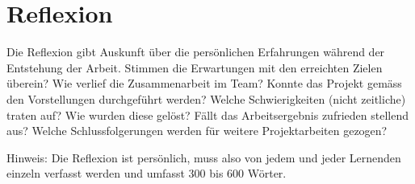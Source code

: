 \part{Reflexion}
Die Reflexion gibt Auskunft über die persönlichen Erfahrungen während der Entstehung der Arbeit. Stimmen die Erwartungen mit den erreichten Zielen überein? Wie verlief die Zusammenarbeit im Team? Konnte das Projekt gemäss den Vorstellungen durchgeführt werden? Welche Schwierigkeiten (nicht zeitliche) traten auf? Wie wurden diese gelöst? Fällt das Arbeitsergebnis zufrieden stellend aus? Welche Schlussfolgerungen werden für weitere Projektarbeiten gezogen? 

Hinweis:
Die Reflexion ist persönlich, muss also von jedem und jeder Lernenden einzeln verfasst werden und umfasst 300 bis 600 Wörter.
